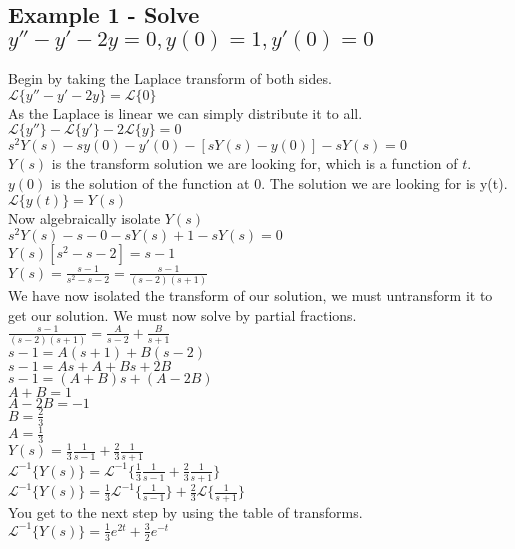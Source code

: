 \documentclass[12pt, letterpaper, twoside]{article}
\newcommand{\laplace}{\mathcal{L}}
\begin{document}
\subsection*{Example 1 - Solve $y''-y'-2y=0, y(0)=1, y'(0)=0$}
Begin by taking the Laplace transform of both sides.\\
$\laplace\{y''-y'-2y\}=\laplace\{0\}$\\
As the Laplace is linear we can simply distribute it to all.\\
$\laplace\{y''\}-\laplace\{y'\}-2\laplace\{y\}=0$\\
$s^2Y(s)-sy(0)-y'(0)-[sY(s)-y(0)]-sY(s)=0$\\
$Y(s)$ is the transform solution we are looking for, which is a function of $t$. $y(0)$ is the solution of the function at 0. The solution we are looking for is y(t). $
\laplace\{y(t)\}=Y(s)$\\
Now algebraically isolate $Y(s)$\\
$s^2Y(s)-s-0-sY(s)+1-sY(s)=0$\\
$Y(s)[s^2-s-2]=s-1$\\
$Y(s)=\frac{s-1}{s^2-s-2}=\frac{s-1}{(s-2)(s+1)}$\\
We have now isolated the transform of our solution, we must untransform it to get our solution. We must now solve by partial fractions.\\
$\frac{s-1}{(s-2)(s+1)}=\frac{A}{s-2} + \frac{B}{s+1}$\\
$s-1 = A(s+1)+B(s-2)$\\
$s-1=As+A+Bs+2B$\\
$s-1=(A+B)s+(A-2B)$\\
$A+B=1$\\
$A-2B=-1$\\
$B=\frac{2}{3}$\\
$A=\frac{1}{3}$\\
$Y(s)=\frac{1}{3}\frac{1}{s-1}+\frac{2}{3}\frac{1}{s+1}$\\
$\laplace^{-1}\{Y(s)\}=\laplace^{-1}\{\frac{1}{3}\frac{1}{s-1}+\frac{2}{3}\frac{1}{s+1}\}$\\
$\laplace^{-1}\{Y(s)\}=\frac{1}{3}\laplace^{-1}\{\frac{1}{s-1}\}+\frac{2}{3}\laplace\{\frac{1}{s+1}\}$\\
You get to the next step by using the table of transforms.\\
$\laplace^{-1}\{Y(s)\}=\frac{1}{3}e^{2t}+\frac{3}{2}e^{-t}$\\
\end{document}
